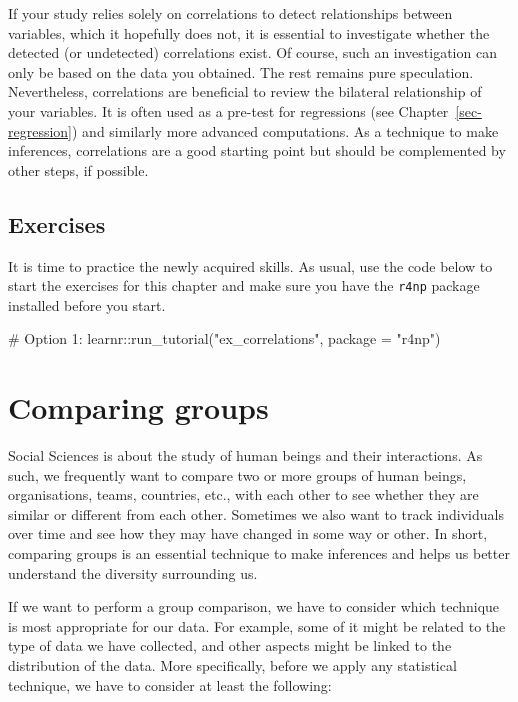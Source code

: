 \documentclass[
  letterpaper,
]{krantz}
\makeatletter
\newenvironment{Shaded}{\begin{snugshade}}{\end{snugshade}}
\newcommand{\AttributeTok}[1]{\textcolor[rgb]{0.40,0.45,0.13}{#1}}
\newcommand{\CommentTok}[1]{\textcolor[rgb]{0.37,0.37,0.37}{#1}}
\newcommand{\FunctionTok}[1]{\textcolor[rgb]{0.28,0.35,0.67}{#1}}
\newcommand{\NormalTok}[1]{\textcolor[rgb]{0.00,0.23,0.31}{#1}}
\newcommand{\SpecialCharTok}[1]{\textcolor[rgb]{0.37,0.37,0.37}{#1}}
\newcommand{\StringTok}[1]{\textcolor[rgb]{0.13,0.47,0.30}{#1}}
\newenvironment{kframe}{%
\medskip{}
\setlength{\fboxsep}{.8em}
 \def\at@end@of@kframe{}%
 \ifinner\ifhmode%
  \def\at@end@of@kframe{\end{minipage}}%
  \begin{minipage}{\columnwidth}%
 \fi\fi%
 \def\FrameCommand##1{\hskip\@totalleftmargin \hskip-\fboxsep
 \colorbox{shadecolor}{##1}\hskip-\fboxsep
     \hskip-\linewidth \hskip-\@totalleftmargin \hskip\columnwidth}%
 \MakeFramed {\advance\hsize-\width
   \@totalleftmargin\z@ \linewidth\hsize
   \@setminipage}}%
 {\par\unskip\endMakeFramed%
 \at@end@of@kframe}
\renewenvironment{Shaded}{\begin{kframe}}{\end{kframe}}
\makeatother
\begin{document}
If your study relies solely on correlations to detect relationships
between variables, which it hopefully does not, it is essential to
investigate whether the detected (or undetected) correlations exist. Of
course, such an investigation can only be based on the data you
obtained. The rest remains pure speculation. Nevertheless, correlations
are beneficial to review the bilateral relationship of your variables.
It is often used as a pre-test for regressions (see
Chapter~\ref{sec-regression}) and similarly more advanced computations.
As a technique to make inferences, correlations are a good starting
point but should be complemented by other steps, if possible.

\section{Exercises}\label{sec-exercises-correlations}

It is time to practice the newly acquired skills. As usual, use the code
below to start the exercises for this chapter and make sure you have the
\texttt{r4np} package installed before you start.

\begin{Shaded}
\begin{Highlighting}[]
\CommentTok{\# Option 1:}
\NormalTok{learnr}\SpecialCharTok{::}\FunctionTok{run\_tutorial}\NormalTok{(}\StringTok{"ex\_correlations"}\NormalTok{, }\AttributeTok{package =} \StringTok{"r4np"}\NormalTok{)}
\end{Highlighting}
\end{Shaded}


\chapter{Comparing groups}\label{sec-comparing-groups}

Social Sciences is about the study of human beings and their
interactions. As such, we frequently want to compare two or more groups
of human beings, organisations, teams, countries, etc., with each other
to see whether they are similar or different from each other. Sometimes
we also want to track individuals over time and see how they may have
changed in some way or other. In short, comparing groups is an essential
technique to make inferences and helps us better understand the
diversity surrounding us.

If we want to perform a group comparison, we have to consider which
technique is most appropriate for our data. For example, some of it
might be related to the type of data we have collected, and other
aspects might be linked to the distribution of the data. More
specifically, before we apply any statistical technique, we have to
consider at least the following:
\end{document}

